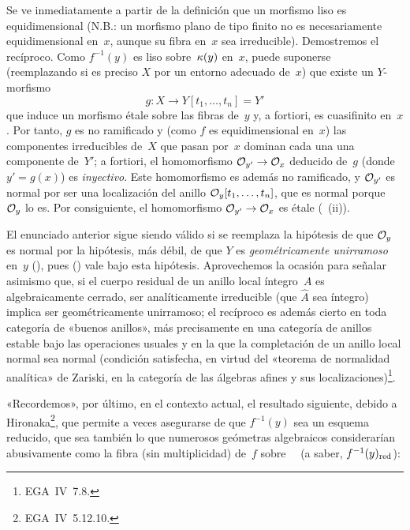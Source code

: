 Se ve inmediatamente a partir de la definición que un morfismo liso es equidimensional (N.B.: un morfismo plano de tipo finito no es necesariamente equidimensional en~$x$, aunque su fibra en~$x$ sea irreducible). Demostremos el recíproco. Como $f^{-1}(y)$ es liso sobre~$\kres(y)$ en~$x$, puede suponerse (reemplazando si es preciso $X$ por un entorno adecuado de~$x$) que existe un $Y$-morfismo
\[
g\colon X\to Y[t_1,\dots,t_n]=Y'
\]
que induce un morfismo étale sobre las fibras de~$y$ y, a fortiori, es cuasifinito en~$x$. Por tanto,
$g$ es no ramificado y (como $f$ es equidimensional en~$x$) las componentes irreducibles de~$X$ que pasan por~$x$ dominan cada una una componente de~$Y'$; a fortiori, el homomorfismo $\cal{O}_{y'}\to\cal{O}_x$ deducido de~$g$ (donde $y'=g(x)$) es \emph{inyectivo}. Este homomorfismo es además no ramificado, y $\cal{O}_{y'}$ es normal por ser una localización del anillo $\cal{O}_y[t_1,\dots,t_n]$, que es normal porque $\cal{O}_y$ lo es. Por consiguiente, el homomorfismo $\cal{O}_{y'}\to\cal{O}_x$ es étale (~\textup{(ii)}).

\begin{remarques}
\label{II.2.4}
El enunciado anterior sigue siendo válido si se reemplaza la hipótesis de que $\cal{O}_y$ es normal por la hipótesis, más débil, de que $Y$ es \emph{geométricamente unirramoso} en~$y$ (\cf {}), pues () vale bajo esta hipótesis. Aprovechemos la ocasión para señalar asimismo que, si el cuerpo residual de un anillo local íntegro~$A$ es algebraicamente cerrado, ser analíticamente irreducible
%
(\ie que $\widehat{A}$ sea íntegro) implica ser geométricamente unirramoso; el recíproco es además cierto en toda categoría de «buenos anillos», más precisamente en una categoría de anillos estable bajo las operaciones usuales y en la que la completación de un anillo local normal sea normal (condición satisfecha, en virtud del «teorema de normalidad analítica» de Zariski, en la categoría de las álgebras afines y sus localizaciones)\footnote{\Cf EGA~IV~7.8.}.

«Recordemos», por último, en el contexto actual, el resultado siguiente, debido a Hironaka\footnote{\Cf EGA~IV~5.12.10.}, que permite a veces asegurarse de que $f^{-1}(y)$ sea un esquema reducido, \ie que sea también lo que numerosos geómetras algebraicos considerarían abusivamente como la fibra (sin multiplicidad) de~$f$ sobre~\ %
(a saber, $f^{-1}(y)_{\red}$):
\end{remarques}

